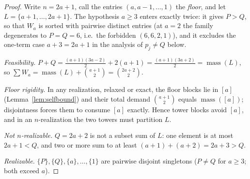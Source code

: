 \documentclass[11pt]{article}
\theoremstyle{definition}
\theoremstyle{remark}
\newcommand{\mass}{\operatorname{mass}}
\newcommand{\intv}[1]{[#1]}
\begin{document}
\begin{proof}
Write $n=2a+1$, call the entries $(a,a-1,\dots,1)$ the \emph{floor}, and let
$L=\{a+1,\dots,2a+1\}$. The hypothesis $a\ge3$ enters exactly twice: it gives
$P>Q$, so that $W_a$ is sorted with pairwise distinct entries (at $a=2$ the family
degenerates to $P=Q=6$, i.e.\ the forbidden $(6,6,2,1)$), and it excludes the
one-term case $a+3=2a+1$ in the analysis of $p_j\neq Q$ below.

\emph{Feasibility.} $P+Q=\frac{(a+1)(3a-2)}{2}+2(a+1)=\frac{(a+1)(3a+2)}{2}
=\mass(L)$, so $\sum W_a=\mass(L)+\binom{a+1}{2}=\binom{2a+2}{2}$.

\emph{Floor rigidity.} In any realization, relaxed or exact, the floor blocks lie in
$\intv a$ (Lemma~\ref{lem:selfbound}) and their total demand $\binom{a+1}{2}$ equals
$\mass(\intv a)$; disjointness forces them to consume $\intv a$ exactly. Hence
tower blocks avoid $\intv a$, and in an $n$-realization the two towers must
partition $L$.

\emph{Not $n$-realizable.} $Q=2a+2$ is not a subset sum of $L$: one element is at
most $2a+1<Q$, and two or more sum to at least $(a+1)+(a+2)=2a+3>Q$.

\emph{Realizable.} $\{P\},\{Q\},\{a\},\dots,\{1\}$ are pairwise disjoint singletons
($P\neq Q$ for $a\ge3$; both exceed $a$).


\end{proof}
\end{document}
